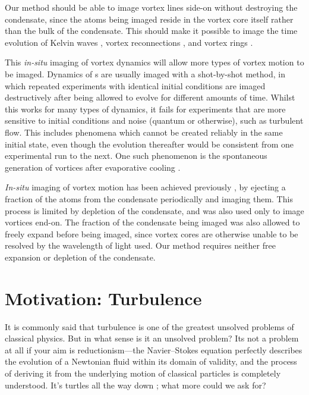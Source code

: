 Our method should be able to image vortex lines side-on without destroying the condensate, since the atoms being imaged reside in the vortex core itself rather than the bulk of the condensate. This should make it possible to image the time evolution of Kelvin waves \cite{bretin_quadrupole_2003}, vortex reconnections \cite{leadbeater_sound_2001}, and vortex rings \cite{anderson_watching_2001}.

This \emph{in-situ} imaging of vortex dynamics will allow more types of vortex motion to be imaged. Dynamics of \bec s are usually imaged with a shot-by-shot method, in which repeated experiments with identical initial conditions are imaged destructively after being allowed to evolve for different amounts of time. Whilst this works for many types of dynamics, it fails for experiments that are more sensitive to initial conditions and noise (quantum or otherwise), such as turbulent flow. This includes phenomena which cannot be created reliably in the same initial state, even though the evolution thereafter would be consistent from one experimental run to the next. One such phenomenon is the spontaneous generation of vortices after evaporative cooling \cite{weiler_spontaneous_2008}.

\emph{In-situ} imaging of vortex motion has been achieved previously \cite{freilich_real-time_2010}, by ejecting a fraction of the atoms from the condensate periodically and imaging them. This process is limited by depletion of the condensate, and was also used only to image vortices end-on. The fraction of the condensate being imaged was also allowed to freely expand before being imaged, since vortex cores are otherwise unable to be resolved by the wavelength of light used. Our method requires neither free expansion or depletion of the condensate.

\section{Motivation: Turbulence}

It is commonly said that turbulence is one of the greatest unsolved problems of classical physics. But in what sense is it an unsolved problem? Its not a problem at all if your aim is reductionism---the Navier--Stokes equation perfectly describes the evolution of a Newtonian fluid within its domain of validity, and the process of deriving it from the underlying motion of classical particles is completely understood. It's turtles all the way down \cite[p 1]{hawking_brief_1988}; what more could we ask for?

